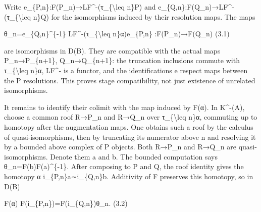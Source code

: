 Write e\_\allowbreak{}\{P,\allowbreak{}n\}:\allowbreak{}F(P\_\allowbreak{}n)\allowbreak{}\allowbreak{}→LF\textasciicircum{}-(τ\_\allowbreak{}\{\textbackslash{}leq n\}P)\allowbreak{} and e\_\allowbreak{}\{Q,\allowbreak{}n\}:\allowbreak{}F(Q\_\allowbreak{}n)\allowbreak{}\allowbreak{}→LF\textasciicircum{}-(τ\_\allowbreak{}\{\textbackslash{}leq n\}Q)\allowbreak{} for the isomorphisms induced by their resolution maps. The maps

θ\_\allowbreak{}n\allowbreak{}=e\_\allowbreak{}\{Q,\allowbreak{}n\}\textasciicircum{}\{-1\} LF\textasciicircum{}-(τ\_\allowbreak{}\{\textbackslash{}leq n\}α)\allowbreak{}e\_\allowbreak{}\{P,\allowbreak{}n\} :\allowbreak{}F(P\_\allowbreak{}n)\allowbreak{}\allowbreak{}→F(Q\_\allowbreak{}n)\allowbreak{} (3.1)\allowbreak{}

are isomorphisms in D(B)\allowbreak{}. They are compatible with the actual maps P\_\allowbreak{}n\allowbreak{}→P\_\allowbreak{}\{n\allowbreak{}+1\},\allowbreak{} Q\_\allowbreak{}n\allowbreak{}→Q\_\allowbreak{}\{n\allowbreak{}+1\}:\allowbreak{} the truncation inclusions commute with τ\_\allowbreak{}\{\textbackslash{}leq n\}α,\allowbreak{} LF\^{}- is a functor,\allowbreak{} and the identifications e respect maps between the P resolutions. This proves stage compatibility,\allowbreak{} not just existence of unrelated isomorphisms.

It remains to identify their colimit with the map induced by F(α)\allowbreak{}. In K\textasciicircum{}-(A)\allowbreak{},\allowbreak{} choose a common roof R\allowbreak{}→P\_\allowbreak{}n and R\allowbreak{}→Q\_\allowbreak{}n over τ\_\allowbreak{}\{\textbackslash{}leq n\}α,\allowbreak{} commuting up to homotopy after the augmentation maps. One obtains such a roof by the calculus of quasi-isomorphisms,\allowbreak{} then by truncating its numerator above n and resolving it by a bounded above complex of P objects. Both R\allowbreak{}→P\_\allowbreak{}n and R\allowbreak{}→Q\_\allowbreak{}n are quasi-isomorphisms. Denote them a and b. The bounded computation says θ\_\allowbreak{}n\allowbreak{}=F(b)\allowbreak{}F(a)\allowbreak{}\textasciicircum{}\{-1\}. After composing to P and Q,\allowbreak{} the roof identity gives the homotopy α i\_\allowbreak{}\{P,\allowbreak{}n\}a∼i\_\allowbreak{}\{Q,\allowbreak{}n\}b. Additivity of F preserves this homotopy,\allowbreak{} so in D(B)\allowbreak{}

F(α)\allowbreak{} F(i\_\allowbreak{}\{P,\allowbreak{}n\})\allowbreak{}\allowbreak{}=F(i\_\allowbreak{}\{Q,\allowbreak{}n\})\allowbreak{}θ\_\allowbreak{}n. (3.2)\allowbreak{}


